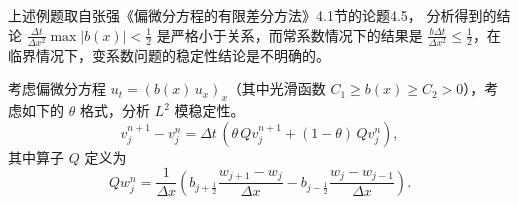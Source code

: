\begin{remark}
    上述例题取自张强《偏微分方程的有限差分方法》4.1节的论题4.5，
    分析得到的结论 $\frac{\Delta t}{\Delta x^2} \max | b(x)| < \frac12$ 是严格小于关系，而常系数情况下的结果是 $\frac{b \Delta t}{\Delta x^2} \le \frac12$，在临界情况下，变系数问题的稳定性结论是不明确的。
\end{remark}


\begin{example}
    考虑偏微分方程 $u_t=(b(x)\, u_x)_x$（其中光滑函数 $C_1 \ge b(x) \ge C_2 > 0$），考虑如下的 $\theta$ 格式，分析 $L^2$ 模稳定性。
    \[
        v^{n+1}_j - v^n_j = \Delta t\,(\theta\,Q v^{n+1}_j+(1-\theta)\, Q v^n_j),
    \]
    其中算子 $Q$ 定义为
    \[
        Q w^n_j=\frac{1}{\Delta x}\left(b_{j+\frac12} \frac{w_{j+1}-w_{j}}{\Delta x} - b_{j-\frac12}\frac{w_j-w_{j-1}}{\Delta x}\right).
    \]
\end{example}

